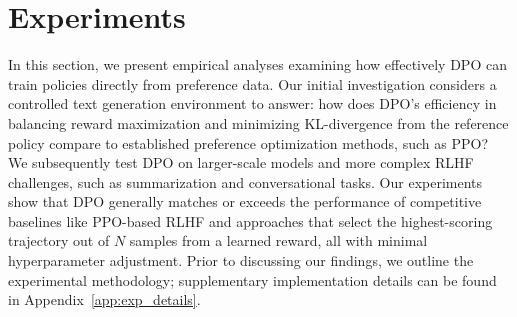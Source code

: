\section{Experiments}
In this section, we present empirical analyses examining how effectively DPO can train policies directly from preference data. Our initial investigation considers a controlled text generation environment to answer: how does DPO’s efficiency in balancing reward maximization and minimizing KL-divergence from the reference policy compare to established preference optimization methods, such as PPO? We subsequently test DPO on larger-scale models and more complex RLHF challenges, such as summarization and conversational tasks. Our experiments show that DPO generally matches or exceeds the performance of competitive baselines like PPO-based RLHF and approaches that select the highest-scoring trajectory out of $N$ samples from a learned reward, all with minimal hyperparameter adjustment. Prior to discussing our findings, we outline the experimental methodology; supplementary implementation details can be found in Appendix~\ref{app:exp_details}.

